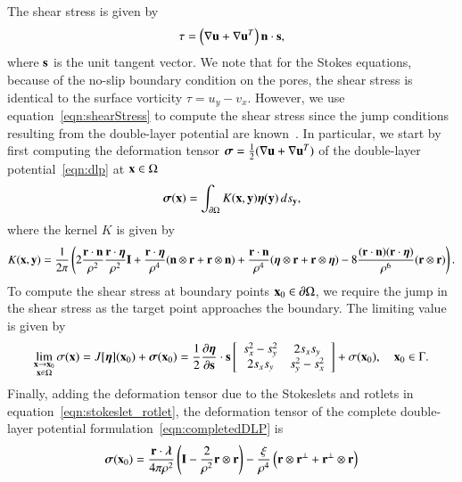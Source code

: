 \documentclass[preprint, 10pt]{elsarticle}
\begin{document}
The shear stress is given by
\begin{align}
  \tau = \left(\nabla \uu + \nabla \uu^T \right)\nn \cdot \ss,
  \label{eqn:shearStress}
\end{align}
where $\ss$ is the unit tangent vector.  We note that for the Stokes
equations, because of the no-slip boundary condition on the pores, the
shear stress is identical to the surface vorticity $\tau = u_y - v_x$.
However, we use equation~\eqref{eqn:shearStress} to compute the shear
stress since the jump conditions resulting from the double-layer
potential are known~\cite{qua-bir2014a}.  In particular, we start by
first computing the deformation tensor $\ssigma = \frac{1}{2}(\nabla\uu
+ \nabla\uu^T)$ of the double-layer potential~\eqref{eqn:dlp} at $\xx
\in \Omega$
\begin{align*}
  \ssigma(\xx) = \int_{\bd\Omega} K(\xx,\yy) \eeta(\yy) \,ds_\yy,
\end{align*}
where the kernel $K$ is given by
\begin{align*}
  K(\xx,\yy) = \frac{1}{2\pi}\left(
    2\frac{\rr \cdot \nn}{\rho^2} \frac{\rr \cdot \eeta}{\rho^2} \II + 
    \frac{\rr \cdot \eeta}{\rho^4} (\nn \otimes \rr + \rr \otimes \nn) +
    \frac{\rr \cdot \nn}{\rho^4} (\eeta \otimes \rr + \rr \otimes \eeta) - 
    8\frac{(\rr \cdot \nn)(\rr \cdot \eeta)}{\rho^6}(\rr \otimes \rr)
  \right).
\end{align*}
To compute the shear stress at boundary points $\xx_0 \in \bd\Omega$, we
require the jump in the shear stress as the target point approaches the
boundary.  The limiting value is given by
\begin{align}
  \lim_{\substack{\xx \rightarrow \xx_0 \\ \xx \in \Omega}}\sigma(\xx) =
  J[\eeta](\xx_0) + \ssigma(\xx_0) = 
  \frac{1}{2}\pderiv{\eeta}{\ss} \cdot \ss
  \left[ \begin{array}{cc}
    s_x^2 - s_y^2 & 2s_x s_y \\ 2s_x s_y & s_y^2 - s_x^2
  \end{array}\right] + \sigma(\xx_0), \quad \xx_0 \in \Gamma.
\end{align}
Finally, adding the deformation tensor due to the Stokeslets and rotlets
in equation~\eqref{eqn:stokeslet_rotlet}, the deformation tensor of the
complete double-layer potential formulation~\eqref{eqn:completedDLP} is
\begin{align}
  \ssigma(\xx_0) = \frac{\rr \cdot \llambda}{4\pi\rho^2} \left(
    \II - \frac{2}{\rho^2} \rr \otimes \rr \right) -
  \frac{\xi}{\rho^4} \left(\rr \otimes \rr^\perp + 
                           \rr^\perp \otimes \rr \right)
\end{align}
\end{document}
